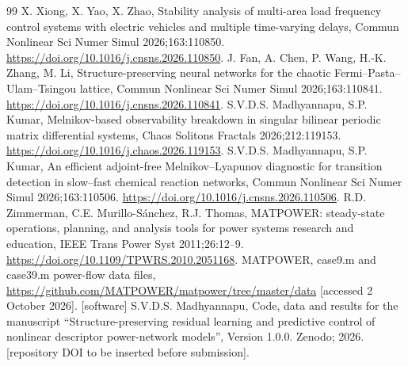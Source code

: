 \documentclass[preprint,12pt]{elsarticle}
\newcommand{\repodoi}{[repository DOI to be inserted before submission]}
\begin{document}
\begin{thebibliography}{99}
 X. Xiong, X. Yao, X. Zhao, Stability analysis of multi-area load frequency control systems with electric vehicles and multiple time-varying delays, Commun Nonlinear Sci Numer Simul 2026;163:110850. \url{https://doi.org/10.1016/j.cnsns.2026.110850}.
 J. Fan, A. Chen, P. Wang, H.-K. Zhang, M. Li, Structure-preserving neural networks for the chaotic Fermi--Pasta--Ulam--Tsingou lattice, Commun Nonlinear Sci Numer Simul 2026;163:110841. \url{https://doi.org/10.1016/j.cnsns.2026.110841}.
 S.V.D.S. Madhyannapu, S.P. Kumar, Melnikov-based observability breakdown in singular bilinear periodic matrix differential systems, Chaos Solitons Fractals 2026;212:119153. \url{https://doi.org/10.1016/j.chaos.2026.119153}.
 S.V.D.S. Madhyannapu, S.P. Kumar, An efficient adjoint-free Melnikov--Lyapunov diagnostic for transition detection in slow--fast chemical reaction networks, Commun Nonlinear Sci Numer Simul 2026;163:110506. \url{https://doi.org/10.1016/j.cnsns.2026.110506}.
 R.D. Zimmerman, C.E. Murillo-S{\'a}nchez, R.J. Thomas, MATPOWER: steady-state operations, planning, and analysis tools for power systems research and education, IEEE Trans Power Syst 2011;26:12--9. \url{https://doi.org/10.1109/TPWRS.2010.2051168}.
 MATPOWER, case9.m and case39.m power-flow data files, \url{https://github.com/MATPOWER/matpower/tree/master/data} [accessed 2 October 2026].
 [software] S.V.D.S. Madhyannapu, Code, data and results for the manuscript ``Structure-preserving residual learning and predictive control of nonlinear descriptor power-network models'', Version 1.0.0. Zenodo; 2026. \repodoi.
\end{thebibliography}
\end{document}
